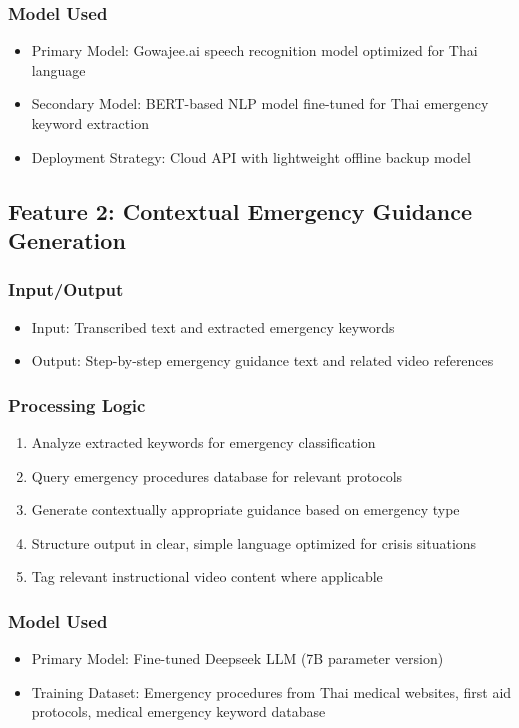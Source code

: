 \subsubsection{Model Used}
\begin{itemize}
    \item Primary Model: Gowajee.ai speech recognition model optimized for Thai language
    \item Secondary Model: BERT-based NLP model fine-tuned for Thai emergency keyword extraction
    \item Deployment Strategy: Cloud API with lightweight offline backup model
\end{itemize}

\subsection{Feature 2: Contextual Emergency Guidance Generation}

\subsubsection{Input/Output}
\begin{itemize}
    \item Input: Transcribed text and extracted emergency keywords
    \item Output: Step-by-step emergency guidance text and related video references
\end{itemize}

\subsubsection{Processing Logic}
\begin{enumerate}
    \item Analyze extracted keywords for emergency classification
    \item Query emergency procedures database for relevant protocols
    \item Generate contextually appropriate guidance based on emergency type
    \item Structure output in clear, simple language optimized for crisis situations
    \item Tag relevant instructional video content where applicable
\end{enumerate}

\subsubsection{Model Used}
\begin{itemize}
    \item Primary Model: Fine-tuned Deepseek LLM (7B parameter version)
    \item Training Dataset: Emergency procedures from Thai medical websites, first aid protocols, medical emergency keyword database
\end{itemize}


